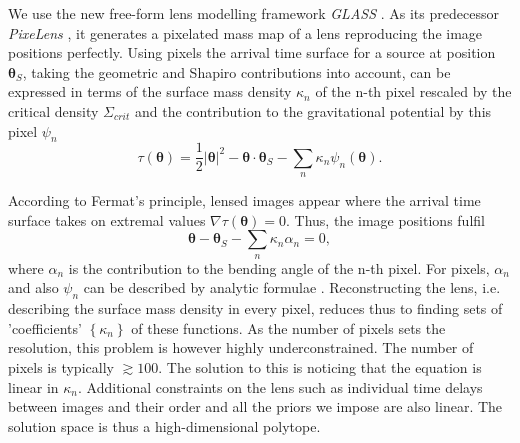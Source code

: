 \documentclass[10pt]{article}
\begin{document}
We use the new free-form lens modelling framework \textit{GLASS} \citep{2012MNRAS.425.3077L}. As its predecessor \textit{PixeLens} \citep{2004AJ....127.2604S}, it generates a pixelated mass map of a lens reproducing the image positions perfectly. Using pixels the arrival time surface for a source at position $\boldsymbol\theta_{S}$, taking the geometric and Shapiro contributions into account, can be expressed in terms of the surface mass density $\kappa_{n}$ of the n-th pixel rescaled by the critical density $\Sigma_{crit}$ and the contribution to the gravitational potential by this pixel $\psi_{n}$ \citep{1997MNRAS.292..148S}
\begin{equation}\label{eq:arrival}
\tau(\boldsymbol\theta)=\frac{1}{2}|\boldsymbol\theta |^{2}-\boldsymbol\theta\cdot\boldsymbol\theta_{S}-\displaystyle\sum\limits_{n} \kappa_{n}\psi_{n}(\boldsymbol\theta).
\end{equation}

According to Fermat's principle, lensed images appear where the arrival time surface takes on extremal values $\nabla\tau(\boldsymbol\theta)=0$. Thus, the image positions fulfil
\begin{equation}
\boldsymbol\theta-\boldsymbol\theta_{S}-\displaystyle\sum\limits_{n} \kappa_{n}\alpha_{n}=0,
\end{equation}
where $\alpha_{n}$ is the contribution to the bending angle of the n-th pixel. For pixels, $\alpha_{n}$ and also $\psi_{n}$ can be described by analytic formulae \citep{1997MNRAS.292..148S}. Reconstructing the lens, i.e. describing the surface mass density in every pixel, reduces thus to finding sets of 'coefficients' $\left\{\kappa_{n}\right\}$ of these functions. As the number of pixels sets the resolution, this problem is however highly underconstrained. The number of pixels is typically $\gtrsim100$. The solution to this is noticing that the equation is linear in $\kappa_{n}$. Additional constraints on the lens such as individual time delays between images and their order and all the priors we impose are also linear. The solution space is thus a high-dimensional polytope.
\end{document}
